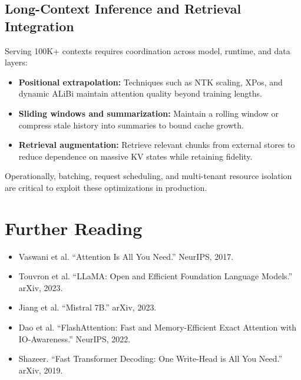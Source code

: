 \documentclass{article}
\begin{document}
\subsection{Long-Context Inference and Retrieval Integration}
Serving 100K+ contexts requires coordination across model, runtime, and data layers:
\begin{itemize}
  \item \textbf{Positional extrapolation:} Techniques such as NTK scaling, XPos, and dynamic ALiBi maintain attention quality beyond training lengths.
  \item \textbf{Sliding windows and summarization:} Maintain a rolling window or compress stale history into summaries to bound cache growth.
  \item \textbf{Retrieval augmentation:} Retrieve relevant chunks from external stores to reduce dependence on massive KV states while retaining fidelity.
\end{itemize}
Operationally, batching, request scheduling, and multi-tenant resource isolation are critical to exploit these optimizations in production.

\section*{Further Reading}
\begin{itemize}
  \item Vaswani et al. ``Attention Is All You Need.'' NeurIPS, 2017.
  \item Touvron et al. ``LLaMA: Open and Efficient Foundation Language Models.'' arXiv, 2023.
  \item Jiang et al. ``Mistral 7B.'' arXiv, 2023.
  \item Dao et al. ``FlashAttention: Fast and Memory-Efficient Exact Attention with IO-Awareness.'' NeurIPS, 2022.
  \item Shazeer. ``Fast Transformer Decoding: One Write-Head is All You Need.'' arXiv, 2019.
\end{itemize}
\end{document}

